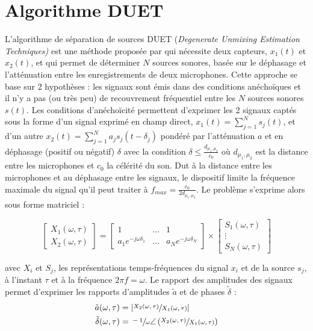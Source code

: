 \section{Algorithme DUET}

L'algorithme de séparation de sources DUET (\textit{Degenerate Unmixing Estimation Techniques)} est une méthode proposée par \cite{rickard2007duet} qui nécessite deux capteurs, $x_1(t)$ et $x_2(t)$, et qui permet de déterminer $N$ sources sonores, basée sur le déphasage et l'atténuation entre les enregistrements de deux microphones. Cette approche se base sur 2 hypothèses : les signaux sont émis dans des conditions anéchoïques et il n'y a pas (ou très peu) de recouvrement fréquentiel entre les $N$ sources sonores $s(t)$. Les conditions d'anéchoïcité permettent d'exprimer les 2 signaux captés sous la forme d'un signal exprimé en champ direct, $x_1(t) = \sum_{j = 1}^{N}s_j(t)$, et d'un autre $x_2(t) = \sum_{j = 1}^{N} a_j s_j(t-\delta_j)$ pondéré par l'atténuation $a$ et en déphasage (positif ou négatif) $\delta$ avec la condition $\delta \leqslant \frac{d_{\mu_1,\mu_2}}{c_0}$ où $d_{\mu_1,\mu_2}$ est la distance entre les microphones et $c_0$ la célérité du son. Dut à la distance entre les microphones et au déphasage entre les signaux, le dispositif limite la fréquence maximale du signal qu'il peut traiter à $f_{max} = \frac{c_0}{2 d_{\mu_1,\mu_2}}$. Le problème s'exprime alors sous forme matriciel : 

\begin{equation}\label{eq:algo-DUET}
\begin{bmatrix}
X_1(\omega,\tau) \\ 
X_2(\omega,\tau)
\end{bmatrix} = 
\begin{bmatrix} 
1 & \dots & 1 \\ 
a_1e^{-j\omega\delta_1} & \dots & a_Ne^{-j\omega\delta_N}
\end{bmatrix} \times 
\begin{bmatrix}
S_1(\omega,\tau) \\ 
\vdots \\
S_N(\omega,\tau) 
\end{bmatrix} 
\end{equation}

avec $X_i$ et $S_j$, les représentations temps-fréquences du signal $x_i$ et de la source $s_j$, à l'instant $\tau$ et à la fréquence $2\pi f = \omega$.
Le rapport des amplitudes des signaux permet d'exprimer les rapports d'amplitudes $\tilde{a}$ et de phases $\tilde{\delta}$ : 
\begin{subequations}
\begin{align}
\tilde{a}(\omega,\tau) &= \vert\sfrac{X_2(\omega,\tau)}{X_1(\omega,\tau)}\vert \\
\tilde{\delta}(\omega,\tau) &= \sfrac{-1}{\omega}\angle\left(\sfrac{X_2(\omega,\tau)}{X_1(\omega,\tau)}\right)
\end{align}
\end{subequations}

